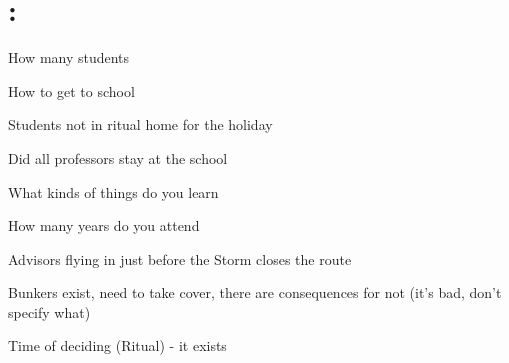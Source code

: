 \documentclass[blue]{GL2020}
\begin{document}
\name{\bSchool{}}

\section*{\pSchool{}:}

\pSchool{} 


How many students


How to get to school


Students not in ritual home for the holiday


Did all professors stay at the school


What kinds of things do you learn


How many years do you attend


Advisors flying in just before the Storm closes the route


Bunkers exist, need to take cover, there are consequences for not (it's bad, don't specify what)


Time of deciding (Ritual) - it exists
\end{document}
